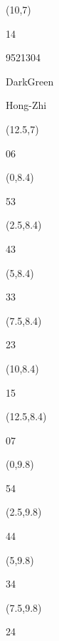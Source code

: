 \documentclass[a4paper]{article}
\newcommand{\myseat}[4]{%
\vspace{-0.1cm}
\parbox[t][2.2cm][t]{3.5cm}{
\small #1 %
\begin{description}
\vspace{-0.1cm}
\item [ID:] #2
\vspace{-0.1cm}
\item [Team:] #3 \normalsize
\vspace{-0.1cm}
\item \normalsize #4
\vspace{-0.1cm}
\end{description}
}
}
\begin{document}
\begin{CJK}{UTF8}{cyberbit}
\begin{textblock}{2.5}(10,7)
\myseat{14}{9521304}{DarkGreen}{Hong-Zhi}
\end{textblock}

\begin{textblock}{2.5}(12.5,7)
\textblockcolor{}
\myseat{06}{}{}{}
\end{textblock}

\begin{textblock}{2.5}(0,8.4)
\textblockcolor{}
\myseat{53}{}{}{}
\end{textblock}

\begin{textblock}{2.5}(2.5,8.4)
\textblockcolor{}
\myseat{43}{}{}{}
\end{textblock}

\begin{textblock}{2.5}(5,8.4)
\textblockcolor{}
\myseat{33}{}{}{}
\end{textblock}

\begin{textblock}{2.5}(7.5,8.4)
\textblockcolor{}
\myseat{23}{}{}{}
\end{textblock}

\begin{textblock}{2.5}(10,8.4)
\textblockcolor{}
\myseat{15}{}{}{}
\end{textblock}

\begin{textblock}{2.5}(12.5,8.4)
\textblockcolor{}
\myseat{07}{}{}{}
\end{textblock}

\begin{textblock}{2.5}(0,9.8)
\textblockcolor{}
\myseat{54}{}{}{}
\end{textblock}

\begin{textblock}{2.5}(2.5,9.8)
\textblockcolor{}
\myseat{44}{}{}{}
\end{textblock}

\begin{textblock}{2.5}(5,9.8)
\textblockcolor{}
\myseat{34}{}{}{}
\end{textblock}

\begin{textblock}{2.5}(7.5,9.8)
\textblockcolor{}
\myseat{24}{}{}{}
\end{textblock}


\end{CJK}
\end{document}
